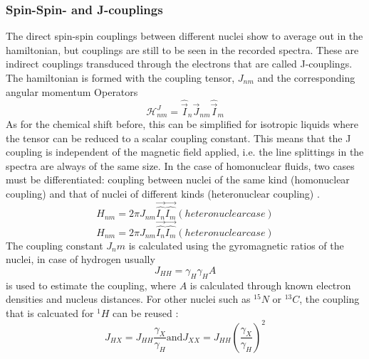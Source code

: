         \subsubsection{Spin-Spin- and J-couplings}
            The direct spin-spin couplings between different nuclei show to average out in the hamiltonian, but couplings are still to be seen in the recorded spectra. These are indirect couplings transduced through the electrons that are called J-couplings. The hamiltonian is formed with the coupling tensor, $J_{nm}$ and the corresponding angular momentum Operators
            \begin{equation}
                \mathcal{H}^J_{nm} = \hat{\vec I}_n \vec J_{nm} \hat{\vec I}_m
            \end{equation}
            As for the chemical shift before, this can be simplified for isotropic liquids where the tensor can be reduced to a scalar coupling constant. This means that the J coupling is independent of the magnetic field applied, i.e. the line splittings in the spectra are always of the same size. In the case of homonuclear fluids, two cases must be differentiated: coupling between nuclei of the same kind (homonuclear coupling) and that of nuclei of different kinds (heteronuclear coupling) \cite{levitt_spin_nodate}.
            \begin{equation}
                H_{nm} = 2\pi J_{nm} \vec{\hat{I_n}} \vec{\hat{I_m}} (heteronuclear case)
            \end{equation}
            \begin{equation}
                H_{nm} = 2\pi J_{nm} \vec{\hat{I_n}} \vec{\hat{I_m}} (heteronuclear case)
            \end{equation}
            The coupling constant $J_nm$ is calculated using the gyromagnetic ratios of the nuclei, in case of hydrogen usually 
            \begin{equation}
                J_{HH} = \gamma_H \gamma_H A
            \end{equation}
            is used to estimate the coupling, where $A$ is calculated through known electron densities and nucleus distances.
            For other nuclei such as $^{15}N$ or $^{13}C$, the coupling that is calcuated for $^1H$ can be reused \cite{levitt_spin_nodate}:
            \begin{equation}
            J_{HX} = J_{HH} \frac{\gamma_X}{\gamma_H} \mathrm{and} J_{XX} = J_{HH} \left(\frac{\gamma_X}{\gamma_H} \right)^2
            \end{equation}
